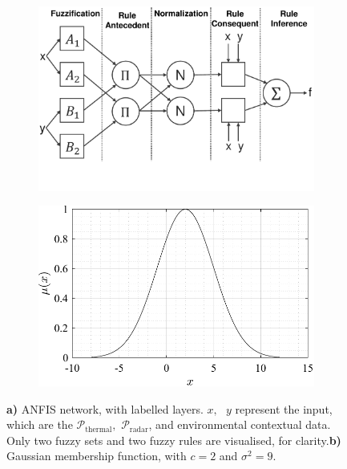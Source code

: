          \begin{figure}[htbp]
          \centering
          \begin{subfigure}[t]{0.48\textwidth} %
            \centering
            \includegraphics[width=\textwidth]{figs/Rory/ANFIS_diagram.pdf}
            \caption{}
            \label{fig:ANFIS_diagram}
          \end{subfigure}
          \hfill
          \begin{subfigure}[t]{0.48\textwidth} %
            \centering
            \includegraphics[width=\textwidth]{figs/Rory/mfs_plot.pdf}
            \caption{}
            \label{fig:membership_function_plot}
          \end{subfigure}
          \caption[ANFIS Network]{\textbf{a)} ANFIS network, with labelled layers. $x, \text{ } y$ represent the input, which are the $\mathcal{P}_\text{thermal},$ $\mathcal{P}_\text{radar}$, and environmental contextual data. Only two fuzzy sets and two fuzzy rules are visualised, for clarity.\textbf{b)} Gaussian membership function, with $c=2$ and $\sigma^2=9$.}
        \end{figure}

